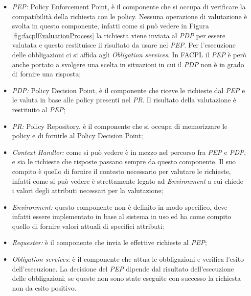 \begin{itemize}
    \item \emph{PEP:} Policy Enforcement Point, è il componente che si occupa di verificare la compatibilità della richiesta con le policy. Nessuna operazione di valutazione è svolta in questo componente, infatti come si può vedere in Figura \ref{fig:facplEvaluationProcess} la richiesta viene inviata al \emph{PDP} per essere valutata e questo restituisce il risultato da usare nel \emph{PEP}. Per l'esecuzione delle obbligazioni ci si affida agli \emph{Obligation services}. In FACPL il \emph{PEP} è però anche portato a svolgere una scelta in situazioni in cui il \emph{PDP} non è in grado di fornire una risposta;
    \item \emph{PDP:} Policy Decision Point, è il componente che riceve le richieste dal \emph{PEP} e le valuta in base alle policy presenti nel \emph{PR}. Il risultato della valutazione è restituito al \emph{PEP};
    \item \emph{PR:} Policy Repository, è il componente che si occupa di memorizzare le policy e di fornirle al Policy Decision Point;
    \item \emph{Context Handler:} come si può vedere è in mezzo nel percorso fra \emph{PEP} e \emph{PDP}, e sia le richieste che risposte passano sempre da questo componente. Il suo compito è quello di fornire il contesto necessario per valutare le richieste, infatti come si può vedere è strettamente legato ad \emph{Environment} a cui chiede i valori degli attributi necessari per la valutazione;
    \item \emph{Environment:} questo componente non è definito in modo specifico, deve infatti essere implementato in base al sistema in uso ed ha come compito quello di fornire valori attuali di specifici attributi;
    \item \emph{Requester:} è il componente che invia le effettive richieste al \emph{PEP};
    \item \emph{Obligation services}: è il componente che attua le obbligazioni e verifica l'esito dell'esecuzione. La decisione del \emph{PEP} dipende dal risultato dell'esecuzione delle obbligazioni; se queste non sono state eseguite con successo la richiesta non da esito positivo.
\end{itemize}

